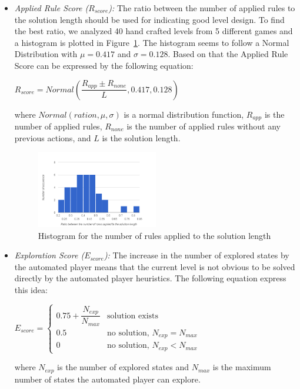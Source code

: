 \documentclass[letterpaper]{article}
\newcommand{\figref}[1]{Figure~\ref{Figure:#1}}
\begin{document}
\begin{itemize}
	\item \emph{Applied Rule Score ($R_{score}$):} The ratio between the number of applied rules to the solution length should be used for indicating good level design. To find the best ratio, we analyzed 40 hand crafted levels from 5 different games and a histogram is plotted in \figref{rulesSolutionLengthHistogram}. The histogram seems to follow a Normal Distribution with $\mu = 0.417$ and $\sigma = 0.128$. Based on that the Applied Rule Score can be expressed by the following equation:
	\begin{center}$R_{score} = Normal(\dfrac{R_{app} \pm R_{none}}{L}, 0.417, 0.128)$\end{center}
	where $Normal(ration, \mu, \sigma)$ is a normal distribution function, $R_{app}$ is the number of applied rules, $R_{none}$ is the number of applied rules without any previous actions, and $L$ is the solution length.
	\begin{figure}
		\centering
		\includegraphics[width=0.5\textwidth]{Images/rulesSolutionLengthHistogram}
		\caption{Histogram for the number of rules applied to the solution length}
		\label{Figure:rulesSolutionLengthHistogram}
	\end{figure}
	
	\item \emph{Exploration Score ($E_{score}$):} The increase in the number of explored states by the automated player means that the current level is not obvious to be solved directly by the automated player heuristics. The following equation express this idea:
	\begin{center}
	$E_{score}= \begin{cases}
	               0.75 + \dfrac{N_{exp}}{N_{max}} & \text{solution exists}\\
	               0.5 & \text{no solution, }N_{exp} = N_{max}\\
	               0 & \text{no solution, }N_{exp} < N_{max}
	           \end{cases}$
	\end{center}
	where $N_{exp}$ is the number of explored states and $N_{max}$ is the maximum number of states the automated player can explore.
\end{itemize}
\end{document}
